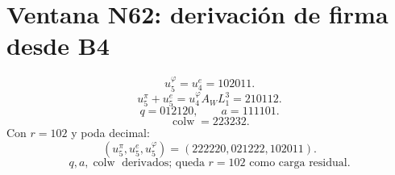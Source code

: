 \section*{Ventana N62: derivación de firma desde B4}
\[\boxed{u_5^\varphi=u_4^e=102011.}\]
\[\boxed{u_5^\pi+u_5^e=u_4^\varphi A_WL_1^3=210112.}\]
\[q=012120,\qquad a=111101.\]
\[\operatorname{colw}=223232.\]
Con \(r=102\) y poda decimal:
\[\boxed{(u_5^\pi,u_5^e,u_5^\varphi)=(222220,021222,102011).}\]
\[\boxed{q,a,\operatorname{colw}\text{ derivados; queda }r=102\text{ como carga residual.}}\]

